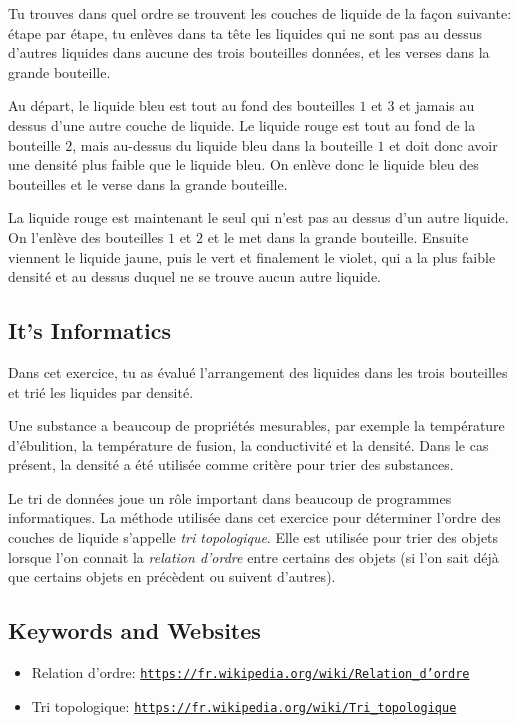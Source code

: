 \documentclass[a4paper,11pt]{report}
\newcommand{\BrochureUrlText}[1]{\texttt{#1}}
\begin{document}
Tu trouves dans quel ordre se trouvent les couches de liquide de la façon suivante: étape par étape, tu enlèves dans ta tête les liquides qui ne sont pas au dessus d’autres liquides dans aucune des trois bouteilles données, et les verses dans la grande bouteille.

Au départ, le liquide bleu est tout au fond des bouteilles $1$ et $3$ et jamais au dessus d’une autre couche de liquide. Le liquide rouge est tout au fond de la bouteille $2$, mais au-dessus du liquide bleu dans la bouteille $1$ et doit donc avoir une densité plus faible que le liquide bleu. On enlève donc le liquide bleu des bouteilles et le verse dans la grande bouteille.

La liquide rouge est maintenant le seul qui n’est pas au dessus d’un autre liquide. On l’enlève des bouteilles $1$ et $2$ et le met dans la grande bouteille. Ensuite viennent le liquide jaune, puis le vert et finalement le violet, qui a la plus faible densité et au dessus duquel ne se trouve aucun autre liquide.


\subsection*{It’s Informatics}

Dans cet exercice, tu as évalué l’arrangement des liquides dans les trois bouteilles et trié les liquides par densité.

Une substance a beaucoup de propriétés mesurables, par exemple la température d’ébulition, la température de fusion, la conductivité et la densité. Dans le cas présent, la densité a été utilisée comme critère pour trier des substances.

Le tri de données joue un rôle important dans beaucoup de programmes informatiques. La méthode utilisée dans cet exercice pour déterminer l’ordre des couches de liquide s’appelle \emph{tri topologique}. Elle est utilisée pour trier des objets lorsque l’on connait la \emph{relation d’ordre} entre certains des objets (si l’on sait déjà que certains objets en précèdent ou suivent d’autres).

{\raggedright

\subsection*{Keywords and Websites}

\begin{itemize}
  \item Relation d’ordre: \href{https://fr.wikipedia.org/wiki/Relation_d\%27ordre}{\BrochureUrlText{https://fr.wikipedia.org/wiki/Relation\_d’ordre}}
  \item Tri topologique: \href{https://fr.wikipedia.org/wiki/Tri_topologique}{\BrochureUrlText{https://fr.wikipedia.org/wiki/Tri\_topologique}}
\end{itemize}


}
\end{document}

